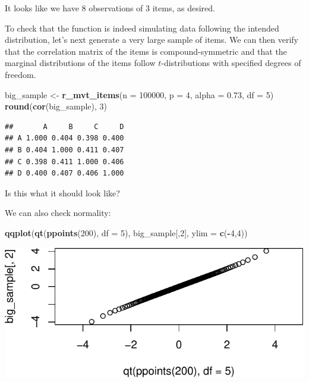 \documentclass[
]{book}
\newenvironment{Shaded}{\begin{snugshade}}{\end{snugshade}}
\newcommand{\AttributeTok}[1]{\textcolor[rgb]{0.13,0.29,0.53}{#1}}
\newcommand{\DecValTok}[1]{\textcolor[rgb]{0.00,0.00,0.81}{#1}}
\newcommand{\FloatTok}[1]{\textcolor[rgb]{0.00,0.00,0.81}{#1}}
\newcommand{\FunctionTok}[1]{\textcolor[rgb]{0.13,0.29,0.53}{\textbf{#1}}}
\newcommand{\NormalTok}[1]{#1}
\newcommand{\OtherTok}[1]{\textcolor[rgb]{0.56,0.35,0.01}{#1}}
\newcommand{\SpecialCharTok}[1]{\textcolor[rgb]{0.81,0.36,0.00}{\textbf{#1}}}
\begin{document}
It looks like we have 8 observations of 3 items, as desired.

To check that the function is indeed simulating data following the intended distribution, let's next generate a very large sample of items. We can then verify that the correlation matrix of the items is compound-symmetric and that the marginal distributions of the items follow \(t\)-distributions with specified degrees of freedom.

\begin{Shaded}
\begin{Highlighting}[]
\NormalTok{big\_sample }\OtherTok{\textless{}{-}} \FunctionTok{r\_mvt\_items}\NormalTok{(}\AttributeTok{n =} \DecValTok{100000}\NormalTok{, }\AttributeTok{p =} \DecValTok{4}\NormalTok{, }\AttributeTok{alpha =} \FloatTok{0.73}\NormalTok{, }\AttributeTok{df =} \DecValTok{5}\NormalTok{)}
\FunctionTok{round}\NormalTok{(}\FunctionTok{cor}\NormalTok{(big\_sample), }\DecValTok{3}\NormalTok{)}
\end{Highlighting}
\end{Shaded}

\begin{verbatim}
##       A     B     C     D
## A 1.000 0.404 0.398 0.400
## B 0.404 1.000 0.411 0.407
## C 0.398 0.411 1.000 0.406
## D 0.400 0.407 0.406 1.000
\end{verbatim}

Is this what it should look like?

We can also check normality:

\begin{Shaded}
\begin{Highlighting}[]
\FunctionTok{qqplot}\NormalTok{(}\FunctionTok{qt}\NormalTok{(}\FunctionTok{ppoints}\NormalTok{(}\DecValTok{200}\NormalTok{), }\AttributeTok{df =} \DecValTok{5}\NormalTok{), big\_sample[,}\DecValTok{2}\NormalTok{], }\AttributeTok{ylim =} \FunctionTok{c}\NormalTok{(}\SpecialCharTok{{-}}\DecValTok{4}\NormalTok{,}\DecValTok{4}\NormalTok{))}
\end{Highlighting}
\end{Shaded}

\begin{center}\includegraphics[width=0.75\linewidth]{Designing-Simulations-in-R_files/figure-latex/unnamed-chunk-121-1} \end{center}
\end{document}
